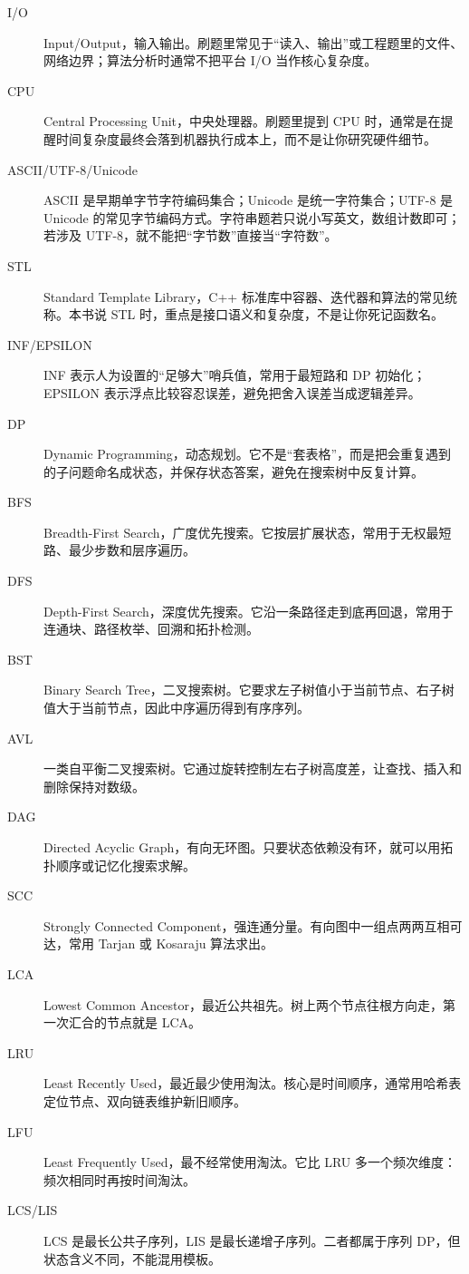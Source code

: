 \begin{description}
  \item[I/O] Input/Output，输入输出。刷题里常见于“读入、输出”或工程题里的文件、网络边界；算法分析时通常不把平台 I/O 当作核心复杂度。
  \item[CPU] Central Processing Unit，中央处理器。刷题里提到 CPU 时，通常是在提醒时间复杂度最终会落到机器执行成本上，而不是让你研究硬件细节。
  \item[ASCII/UTF-8/Unicode] ASCII 是早期单字节字符编码集合；Unicode 是统一字符集合；UTF-8 是 Unicode 的常见字节编码方式。字符串题若只说小写英文，数组计数即可；若涉及 UTF-8，就不能把“字节数”直接当“字符数”。
  \item[STL] Standard Template Library，C++ 标准库中容器、迭代器和算法的常见统称。本书说 STL 时，重点是接口语义和复杂度，不是让你死记函数名。
  \item[INF/EPSILON] INF 表示人为设置的“足够大”哨兵值，常用于最短路和 DP 初始化；EPSILON 表示浮点比较容忍误差，避免把舍入误差当成逻辑差异。
  \item[DP] Dynamic Programming，动态规划。它不是“套表格”，而是把会重复遇到的子问题命名成状态，并保存状态答案，避免在搜索树中反复计算。
  \item[BFS] Breadth-First Search，广度优先搜索。它按层扩展状态，常用于无权最短路、最少步数和层序遍历。
  \item[DFS] Depth-First Search，深度优先搜索。它沿一条路径走到底再回退，常用于连通块、路径枚举、回溯和拓扑检测。
  \item[BST] Binary Search Tree，二叉搜索树。它要求左子树值小于当前节点、右子树值大于当前节点，因此中序遍历得到有序序列。
  \item[AVL] 一类自平衡二叉搜索树。它通过旋转控制左右子树高度差，让查找、插入和删除保持对数级。
  \item[DAG] Directed Acyclic Graph，有向无环图。只要状态依赖没有环，就可以用拓扑顺序或记忆化搜索求解。
  \item[SCC] Strongly Connected Component，强连通分量。有向图中一组点两两互相可达，常用 Tarjan 或 Kosaraju 算法求出。
  \item[LCA] Lowest Common Ancestor，最近公共祖先。树上两个节点往根方向走，第一次汇合的节点就是 LCA。
  \item[LRU] Least Recently Used，最近最少使用淘汰。核心是时间顺序，通常用哈希表定位节点、双向链表维护新旧顺序。
  \item[LFU] Least Frequently Used，最不经常使用淘汰。它比 LRU 多一个频次维度：频次相同时再按时间淘汰。
  \item[LCS/LIS] LCS 是最长公共子序列，LIS 是最长递增子序列。二者都属于序列 DP，但状态含义不同，不能混用模板。

\end{description}
